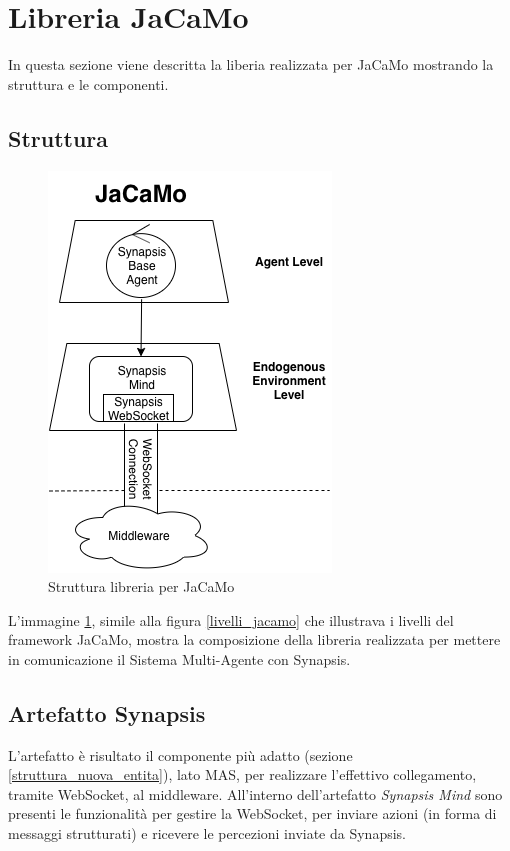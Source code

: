 \section{Libreria JaCaMo}

In questa sezione viene descritta la liberia realizzata per JaCaMo mostrando la struttura e le componenti.

\subsection{Struttura}

\begin{figure}[H]
\centering
\includegraphics[width=0.5\linewidth]{figures/struttura_libreria_JaCaMo.png}
\caption{Struttura libreria per JaCaMo}
\label{JaCamo_synapsis}
\end{figure}

L'immagine \ref{JaCamo_synapsis}, simile alla figura \ref{livelli_jacamo} che illustrava i livelli del framework JaCaMo, mostra la composizione della libreria realizzata per mettere in comunicazione il Sistema Multi-Agente con Synapsis.

\subsection{Artefatto Synapsis} \label{artefatto_synapsis}

L'artefatto è risultato il componente più adatto (sezione \ref{struttura_nuova_entita}), lato MAS, per realizzare l'effettivo collegamento, tramite WebSocket, al middleware. All'interno dell'artefatto \textit{Synapsis Mind} sono presenti le funzionalità per gestire la WebSocket, per inviare azioni (in forma di messaggi strutturati) e ricevere le percezioni inviate da Synapsis.

